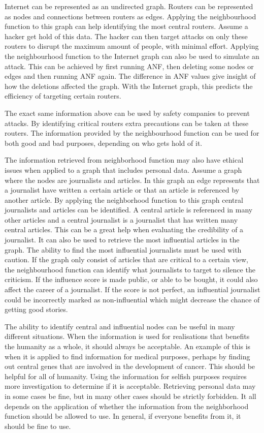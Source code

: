 Internet can be represented as an undirected graph. Routers can be represented as nodes and connections between routers as edges. Applying the neighbourhood function to this graph can help identifying the most central routers. Assume a hacker get hold of this data. The hacker can then target attacks on only these routers to disrupt the maximum amount of people, with minimal effort. Applying the neighbourhood function to the Internet graph can also be used to simulate an attack. This can be achieved by first running ANF, then deleting some nodes or edges and then running ANF again. The difference in ANF values give insight of how the deletions affected the graph. With the Internet graph, this predicts the efficiency of targeting certain routers. 

The exact same information above can be used by safety companies to prevent attacks. By identifying critical routers extra precautions can be taken at these routers. The information provided by the neighbourhood function can be used for both good and bad purposes, depending on who gets hold of it.

The information retrieved from neighborhood function may also have ethical issues when applied to a graph that includes personal data. Assume a graph where the nodes are journalists and articles. In this graph an edge represents that a journalist have written a certain article or that an article is referenced by another article. By applying the neighborhood function to this graph central journalists and articles can be identified. A central article is referenced in many other articles and a central journalist is a journalist that has written many central articles. This can be a great help when evaluating the credibility of a journalist. It can also be used to retrieve the most influential articles in the graph. The ability to find the most influential journalists must be used with caution. If the graph only consist of articles that are critical to a certain view, the neighbourhood function can identify what journalists to target to silence the criticism. If the influence score is made public, or able to be bought, it could also affect the career of a journalist. If the score is not perfect, an influential journalist could be incorrectly marked as non-influential which might decrease the chance of getting good stories.

The ability to identify central and influential nodes can be useful in many different situations. When the information is used for realisations that benefits the humanity as a whole, it should always be acceptable. An example of this is when it is applied to find information for medical purposes, perhaps by finding out central genes that are involved in the development of cancer. This should be helpful for all of humanity. Using the information for selfish purposes requires more investigation to determine if it is acceptable. Retrieving personal data may in some cases be fine, but in many other cases should be strictly forbidden. It all depends on the application of whether the information from the neighborhood function should be allowed to use. In general, if everyone benefits from it, it should be fine to use.

